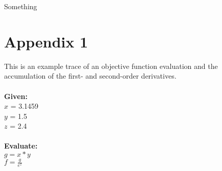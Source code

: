 \documentclass[oneside]{article}
\begin{document}
Something

\section{Appendix 1}
This is an example trace of an objective function evaluation and the accumulation of the first- and second-order derivatives. \\
\\
\textbf{Given: } \\
$x$ = 3.1459 \\
$y$ = 1.5   \\
$z$ = 2.4  \\
\\
\textbf{Evaluate:} \\
$g = x*y$ \\
$f  = \frac{g}{e^z}$
\end{document}
